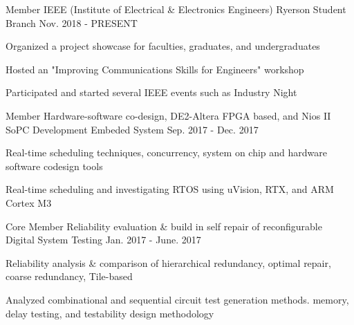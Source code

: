 

\begin{cventries}

  \cventry
    {Member} %
    {IEEE (Institute of Electrical \& Electronics Engineers)} %
    {Ryerson Student Branch} %
    {Nov. 2018 - PRESENT} %
    {
      \begin{cvitems} %
        \item {Organized a project showcase for faculties, graduates, and undergraduates}
        \item {Hosted an "Improving Communications Skills for Engineers" workshop}
        \item {Participated and started several IEEE events such as Industry Night}
      \end{cvitems}
    }

\iffalse
 \cventry
    {Member} %
    {Hardware-software co-design, DE2-Altera FPGA based, and Nios II SoPC Development} %
    {Embeded System} %
    {Sep. 2017 - Dec. 2017} %
    {
      \begin{cvitems} %
        \item {Real-time scheduling techniques, concurrency, system on chip and hardware software codesign tools}
        \item {Real-time scheduling and investigating RTOS using uVision, RTX, and ARM Cortex M3}
      \end{cvitems}
    }
  \cventry
    {Core Member} %
    {Reliability evaluation \& build in self repair of reconfigurable} %
    {Digital System Testing} %
    {Jan. 2017 - June. 2017} %
    {
      \begin{cvitems} %
        \item {Reliability analysis \& comparison of hierarchical redundancy, optimal repair, coarse redundancy, Tile-based}
        \item {Analyzed combinational and sequential circuit test generation methods. memory, delay testing, and testability design methodology}
      \end{cvitems}
    }
    

\end{cventries}
